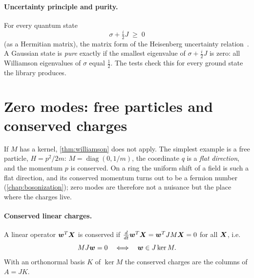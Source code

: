\paragraph{Uncertainty principle and purity.} For every quantum state
\begin{equation}\label{eq:uncertainty}
  \sigma + \tfrac{i}{2}J \;\geq\; 0
\end{equation}
(as a Hermitian matrix), the matrix form of the Heisenberg uncertainty relation~\cite{Weedbrook2012}. A Gaussian
state is \emph{pure} exactly if the smallest eigenvalue of $\sigma + \frac{i}{2}J$ is zero: all Williamson
eigenvalues of $\sigma$ equal $\frac12$. The tests check this for every ground state the library produces.

\section{Zero modes: free particles and conserved charges}\label{sec:zero-modes}
If $M$ has a kernel, \cref{thm:williamson} does not apply. The simplest example is a free particle,
$H = p^2/2m$: $M = \operatorname{diag}(0, 1/m)$, the coordinate $q$ is a \emph{flat direction}, and the momentum
$p$ is conserved. On a ring the uniform shift of a field is such a flat direction, and its conserved momentum
turns out to be a fermion number (\cref{chap:bosonization}); zero modes are therefore not a nuisance but the
place where the charges live.

\paragraph{Conserved linear charges.} A linear operator $\bm{w}^T\bm{X}$ is conserved if
$\frac{d}{dt}\bm{w}^T\bm{X} = \bm{w}^T J M \bm{X} = 0$ for all $\bm{X}$, i.e.
\begin{equation}
  M J \bm{w} = 0 \quad\Longleftrightarrow\quad \bm{w} \in J\ker M .
\end{equation}
With an orthonormal basis $K$ of $\ker M$ the conserved charges are the columns of $A = JK$.

